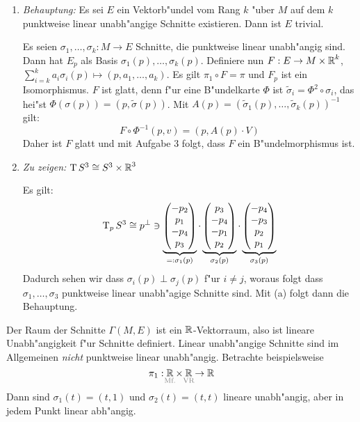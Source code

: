 \begin{Loes}\begin{enumerate}[label=(\alph*),leftmargin=*,widest=a]
\item
	\emph{Behauptung:} Es sei $E$ ein Vektorb"undel vom Rang $k$ "uber $M$ auf dem $k$ punktweise linear unabh"angige Schnitte existieren. Dann ist $E$ trivial.
	
	Es seien $\sigma_1, \ldots, \sigma_k: M \to E$ Schnitte, die punktweise linear unabh"angig sind. Dann hat $E_p$ als Basis $\sigma_1(p),\ldots ,\sigma_k(p)$. Definiere nun $F: E \to M \times \operatorname{\mathbb{R}}^k$, $\sum_{i=k}^k a_i \sigma_i(p) \mapsto (p, a_1,\ldots ,a_k)$. Es gilt $\pi_1 \circ F = \pi$ und $F_p$ ist ein Isomorphismus. $F$ ist glatt, denn f"ur eine B"undelkarte $\Phi$ ist $\tilde \sigma_i = \Phi^2 \circ \sigma_i$, das hei"st $\Phi(\sigma(p)) = (p, \tilde\sigma(p))$. Mit $A(p) = (\tilde\sigma_1(p),\ldots ,\tilde\sigma_k(p))^{-1}$ gilt:
	\[ F \circ \Phi^{-1}(p,v) = (p, A(p) \cdot V) \]
Daher ist $F$ glatt und mit Aufgabe 3 folgt, dass $F$ ein B"undelmorphismus ist.
\item
	\emph{Zu zeigen:} $\operatorname{T} S^3 \cong S^3 \times \operatorname{\mathbb{R}}^3$
	
	Es gilt:
		\[ \operatorname{T}_pS^3 \cong p^\perp \ni \underbrace{\begin{pmatrix} -p_2 \\ p_1 \\ -p_4 \\ p_3 \end{pmatrix}}_{=:\sigma_1(p)} \cdot \underbrace{\begin{pmatrix} p_3 \\ -p_4 \\ -p_1 \\ p_2 \end{pmatrix}}_{\sigma_2(p)} \cdot \underbrace{\begin{pmatrix} -p_4 \\ -p_3 \\ p_2 \\ p_1 \end{pmatrix}}_{\sigma_3(p)} \]
	Dadurch sehen wir dass $\sigma_i(p) \perp \sigma_j(p)$ f"ur $ i \ne j$, woraus folgt dass $\sigma_1, \ldots ,\sigma_3$ punktweise linear unabh"agige Schnitte sind. Mit (a) folgt dann die Behauptung.
\end{enumerate}\end{Loes}

\begin{emptythm}[Anmerkung]
Der Raum der Schnitte $\Gamma(M,E)$ ist ein $\operatorname{\mathbb{R}}$-Vektorraum, also ist lineare Unabh"angigkeit f"ur Schnitte definiert. Linear unabh"angige Schnitte sind im Allgemeinen \emph{nicht} punktweise linear unabh"angig. Betrachte beispielsweise
	\[ \pi_1: \underset{\mathclap{\text{\textcolor{gray}{Mf.}}}}{\R} \X \underset{\mathclap{\text{\textcolor{gray}{VR}}}}{\R} \to \R \]
Dann sind $\sigma_1(t) = (t,1)$ und $\sigma_2(t) = (t,t)$ lineare unabh"angig, aber in jedem Punkt linear abh"angig.
\end{emptythm}